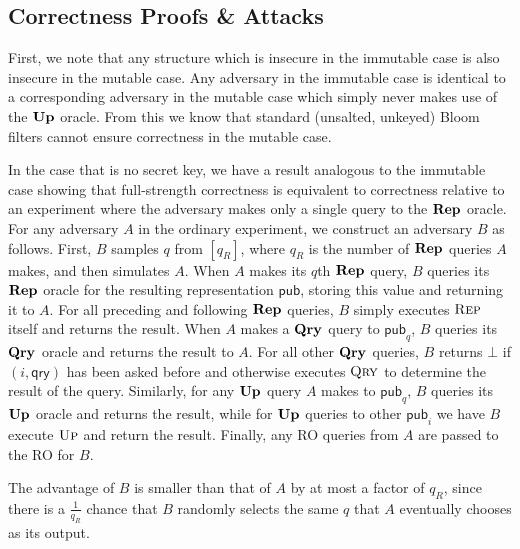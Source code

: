 \subsection{Correctness Proofs \& Attacks}

First, we note that any structure which is insecure in the immutable case is also insecure in the mutable case. Any adversary in the immutable case is identical to a corresponding adversary in the mutable case which simply never makes use of the $\mathbf{Up}\hspace{0.5pt}$ oracle. From this we know that standard (unsalted, unkeyed) Bloom filters cannot ensure correctness in the mutable case.

In the case that is no secret key, we have a result analogous to the immutable case showing that full-strength correctness is equivalent to correctness relative to an experiment where the adversary makes only a single query to the $\mathbf{Rep}\hspace{0.5pt}$ oracle.  For any adversary $A$ in the ordinary experiment, we construct an adversary $B$ as follows. First, $B$ samples $q$ from $[q_R]$, where $q_R$ is the number of $\mathbf{Rep}\hspace{0.5pt}$ queries $A$ makes, and then simulates $A$. When $A$ makes its $q$th $\mathbf{Rep}\hspace{0.5pt}$ query, $B$ queries its $\mathbf{Rep}\hspace{0.5pt}$ oracle for the resulting representation $\mathsf{pub}$, storing this value and returning it to $A$. For all preceding and following $\mathbf{Rep}\hspace{0.5pt}$ queries, $B$ simply executes $\textsc{Rep}$ itself and returns the result. When $A$ makes a $\mathbf{Qry}\hspace{0.5pt}$ query to $\mathsf{pub}_q$, $B$ queries its $\mathbf{Qry}\hspace{0.5pt}$ oracle and returns the result to $A$. For all other $\mathbf{Qry}\hspace{0.5pt}$ queries, $B$ returns $\bot$ if $(i,\mathsf{qry})$ has been asked before and otherwise executes $\textsc{Qry}$ to determine the result of the query. Similarly, for any $\mathbf{Up}\hspace{0.5pt}$ query $A$ makes to $\mathsf{pub}_q$, $B$ queries its $\mathbf{Up}\hspace{0.5pt}$ oracle and returns the result, while for $\mathbf{Up}\hspace{0.5pt}$ queries to other $\mathsf{pub}_i$ we have $B$ execute $\textsc{Up}$ and return the result. Finally, any RO queries from $A$ are passed to the RO for $B$.

The advantage of $B$ is smaller than that of $A$ by at most a factor of $q_R$, since there is a $\frac{1}{q_R}$ chance that $B$ randomly selects the same $q$ that $A$ eventually chooses as its output.

